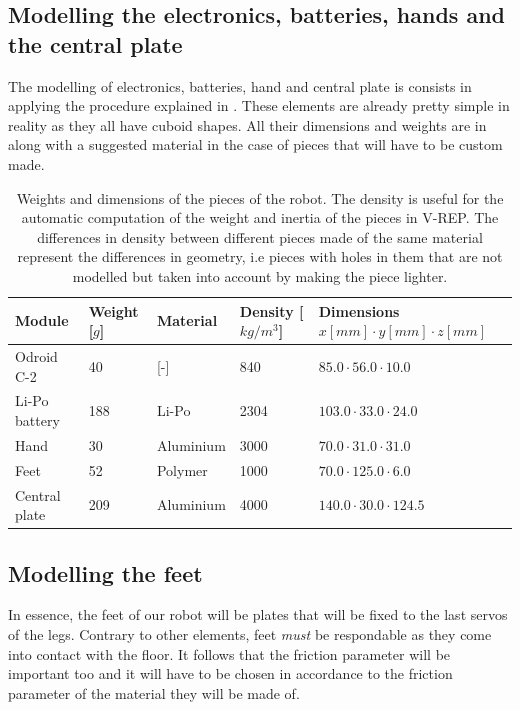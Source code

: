 \subsection{Modelling the electronics, batteries, hands and the central plate}
The modelling of electronics, batteries, hand and central plate is consists in applying the procedure explained in . These elements are already pretty simple in reality as they all have cuboid shapes. All their dimensions and weights are in  along with a suggested material in the case of pieces that will have to be custom made.

\begin{table}[htp]
\center
\begin{tabularx}{\textwidth}{@{} l l X X p{4.1cm} @{}}
\toprule
\textbf{Module} & \textbf{Weight [$g$]} & \textbf{Material} &  \textbf{Density [$kg/m^3$]}& \textbf{Dimensions $x[mm] \cdot y[mm] \cdot z[mm]$}\\ 
\midrule
Odroid C-2 & 40 & [-] & 840 & $85.0 \cdot 56.0 \cdot 10.0$\\
Li-Po battery & 188 & Li-Po & 2304 & $103.0 \cdot 33.0 \cdot 24.0$\\
Hand & 30 & Aluminium & 3000 & $70.0 \cdot 31.0 \cdot 31.0$\\
Feet & 52 & Polymer & 1000 & $70.0 \cdot 125.0 \cdot 6.0$\\
Central plate & 209 & Aluminium & 4000 & $140.0 \cdot 30.0 \cdot 124.5$\\
\bottomrule
\end{tabularx}
\caption[Weights and dimensions of the pieces of the robot]{Weights and dimensions of the pieces of the robot. The density is useful for the automatic computation of the weight and inertia of the pieces in V-REP. The differences in density between different pieces made of the same material represent the differences in geometry, i.e pieces with holes in them that are not modelled but taken into account by making the piece lighter.}
\label{table:weights}
\end{table}

\subsection{Modelling the feet}
In essence, the feet of our robot will be plates that will be fixed to the last servos of the legs. Contrary to other elements, feet \emph{must} be respondable as they come into contact with the floor. It follows that the friction parameter will be important too and it will have to be chosen in accordance to the friction parameter of the material they will be made of.

